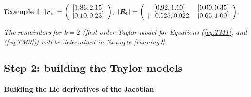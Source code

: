 \documentclass{sig-alternate-05-2015} %
\newcommand\ForAuthors[1]%
 {\par\smallskip                     %
  \begin{center}%
   \fbox%
   {\parbox{0.9\linewidth}%
    {\raggedright\sc--- #1}%
   }%
  \end{center}%
  \par\smallskip                     %
 }
\newtheorem{example}{Example}
\def\intvl#1{\mbox{$[ #1 ]$}}
\begin{document}
\begin{example}
$\intvl{\r_1} = \left(\begin{array}{c}
\left[ 1.86,    2.15 \right]\\ 
\left[ 0.10,    0.23 \right] 
\end{array}\right)$, 
$\intvl{\bfm{R}_1} =\left(\begin{array}{cc} 
\left[    0.92,    1.00\right] & \left[    0.00,    0.35\right] \\
\left[   -0.025,    0.022\right] & \left[    0.65,    1.00\right] 
\end{array}\right)$. 

The remainders
for $k=2$ (first order Taylor model for Equations (\ref{eq:TM1}) and (\ref{eq:TM3}))
will be determined in Example \ref{running3}. 
\end{example}


\subsection{Step 2: building the Taylor models}

\paragraph{Building the Lie derivatives of the Jacobian}

\label{efficientLieJacobian}
\end{document}
